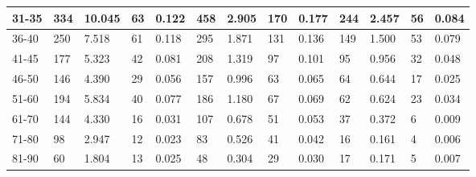 \begin{table*}[]
\begin{tabular}{|l|l|l|l|l|l|l|l|l|l|l|l|l|}
        31-35   & 334                                         & 10.045                                       & 63                                      & 0.122                      & 458                        & 2.905                      & 170   & 0.177 & 244  & 2.457  & 56    & 0.084 \\ \hline
        36-40   & 250                                         & 7.518                                        & 61                                      & 0.118                      & 295                        & 1.871                      & 131   & 0.136 & 149  & 1.500  & 53    & 0.079 \\ \hline
        41-45   & 177                                         & 5.323                                        & 42                                      & 0.081                      & 208                        & 1.319                      & 97    & 0.101 & 95   & 0.956  & 32    & 0.048 \\ \hline
        46-50   & 146                                         & 4.390                                        & 29                                      & 0.056                      & 157                        & 0.996                      & 63    & 0.065 & 64   & 0.644  & 17    & 0.025 \\ \hline
        51-60   & 194                                         & 5.834                                        & 40                                      & 0.077                      & 186                        & 1.180                      & 67    & 0.069 & 62   & 0.624  & 23    & 0.034 \\ \hline
        61-70   & 144                                         & 4.330                                        & 16                                      & 0.031                      & 107                        & 0.678                      & 51    & 0.053 & 37   & 0.372  & 6     & 0.009 \\ \hline
        71-80   & 98                                          & 2.947                                        & 12                                      & 0.023                      & 83                         & 0.526                      & 41    & 0.042 & 16   & 0.161  & 4     & 0.006 \\ \hline
        81-90   & 60                                          & 1.804                                        & 13                                      & 0.025                      & 48                         & 0.304                      & 29    & 0.030 & 17   & 0.171  & 5     & 0.007 \\ \hline

\end{tabular}
\end{table*}
